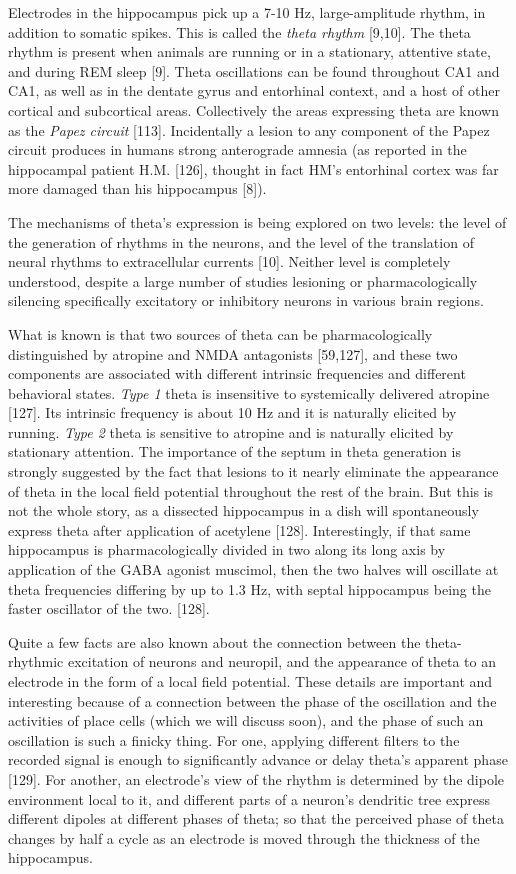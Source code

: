 \documentclass[]{article}
\begin{document}
Electrodes in the hippocampus pick up a 7-10 Hz, large-amplitude rhythm,
in addition to somatic spikes. This is called the \emph{theta rhythm}
{[}9,10{]}. The theta rhythm is present when animals are running or in a
stationary, attentive state, and during REM sleep {[}9{]}. Theta
oscillations can be found throughout CA1 and CA1, as well as in the
dentate gyrus and entorhinal context, and a host of other cortical and
subcortical areas. Collectively the areas expressing theta are known as
the \emph{Papez circuit} {[}113{]}. Incidentally a lesion to any
component of the Papez circuit produces in humans strong anterograde
amnesia (as reported in the hippocampal patient H.M. {[}126{]}, thought
in fact HM's entorhinal cortex was far more damaged than his hippocampus
{[}8{]}).

The mechanisms of theta's expression is being explored on two levels:
the level of the generation of rhythms in the neurons, and the level of
the translation of neural rhythms to extracellular currents {[}10{]}.
Neither level is completely understood, despite a large number of
studies lesioning or pharmacologically silencing specifically excitatory
or inhibitory neurons in various brain regions.

What is known is that two sources of theta can be pharmacologically
distinguished by atropine and NMDA antagonists {[}59,127{]}, and these
two components are associated with different intrinsic frequencies and
different behavioral states. \emph{Type 1} theta is insensitive to
systemically delivered atropine {[}127{]}. Its intrinsic frequency is
about 10 Hz and it is naturally elicited by running. \emph{Type 2} theta
is sensitive to atropine and is naturally elicited by stationary
attention. The importance of the septum in theta generation is strongly
suggested by the fact that lesions to it nearly eliminate the appearance
of theta in the local field potential throughout the rest of the brain.
But this is not the whole story, as a dissected hippocampus in a dish
will spontaneously express theta after application of acetylene
{[}128{]}. Interestingly, if that same hippocampus is pharmacologically
divided in two along its long axis by application of the GABA agonist
muscimol, then the two halves will oscillate at theta frequencies
differing by up to 1.3 Hz, with septal hippocampus being the faster
oscillator of the two. {[}128{]}.

Quite a few facts are also known about the connection between the
theta-rhythmic excitation of neurons and neuropil, and the appearance of
theta to an electrode in the form of a local field potential. These
details are important and interesting because of a connection between
the phase of the oscillation and the activities of place cells (which we
will discuss soon), and the phase of such an oscillation is such a
finicky thing. For one, applying different filters to the recorded
signal is enough to significantly advance or delay theta's apparent
phase {[}129{]}. For another, an electrode's view of the rhythm is
determined by the dipole environment local to it, and different parts of
a neuron's dendritic tree express different dipoles at different phases
of theta; so that the perceived phase of theta changes by half a cycle
as an electrode is moved through the thickness of the hippocampus.
\end{document}
